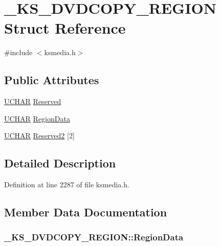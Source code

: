 \hypertarget{struct___k_s___d_v_d_c_o_p_y___r_e_g_i_o_n}{}\section{\+\_\+\+K\+S\+\_\+\+D\+V\+D\+C\+O\+P\+Y\+\_\+\+R\+E\+G\+I\+ON Struct Reference}
\label{struct___k_s___d_v_d_c_o_p_y___r_e_g_i_o_n}


{\ttfamily \#include $<$ksmedia.\+h$>$}

\subsection*{Public Attributes}
\begin{DoxyCompactItemize}
\item 
\hyperlink{xlisp_8h_a9a1dc6d243c6f75bb42f87e3f69649e4}{U\+C\+H\+AR} \hyperlink{struct___k_s___d_v_d_c_o_p_y___r_e_g_i_o_n_acc1a0b34350c12753d6f3f465174d0eb}{Reserved}
\item 
\hyperlink{xlisp_8h_a9a1dc6d243c6f75bb42f87e3f69649e4}{U\+C\+H\+AR} \hyperlink{struct___k_s___d_v_d_c_o_p_y___r_e_g_i_o_n_a2b182d8b8f1264fbab7e053c5df35e26}{Region\+Data}
\item 
\hyperlink{xlisp_8h_a9a1dc6d243c6f75bb42f87e3f69649e4}{U\+C\+H\+AR} \hyperlink{struct___k_s___d_v_d_c_o_p_y___r_e_g_i_o_n_a07a4ae5ff1adbedc3c18f6bea1e90791}{Reserved2} \mbox{[}2\mbox{]}
\end{DoxyCompactItemize}


\subsection{Detailed Description}


Definition at line 2287 of file ksmedia.\+h.



\subsection{Member Data Documentation}
\subsubsection[{\texorpdfstring{Region\+Data}{RegionData}}]{ \+\_\+\+K\+S\+\_\+\+D\+V\+D\+C\+O\+P\+Y\+\_\+\+R\+E\+G\+I\+O\+N\+::\+Region\+Data}\hypertarget{struct___k_s___d_v_d_c_o_p_y___r_e_g_i_o_n_a2b182d8b8f1264fbab7e053c5df35e26}{}\label{struct___k_s___d_v_d_c_o_p_y___r_e_g_i_o_n_a2b182d8b8f1264fbab7e053c5df35e26}


